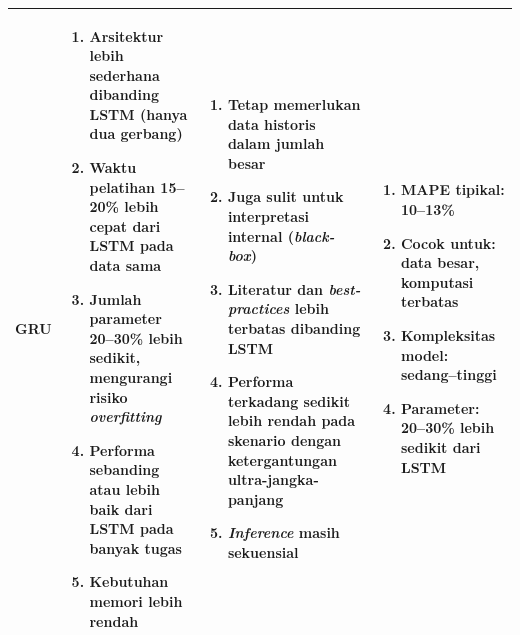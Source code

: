 \begin{longtable}{|p{1.8cm}|p{3.5cm}|p{3.8cm}|p{3cm}|}
\textbf{GRU} &
\begin{enumerate}[leftmargin=*,itemsep=0.5pt,topsep=1pt,partopsep=0pt]
  \item Arsitektur lebih sederhana dibanding LSTM (hanya dua gerbang)
  \item Waktu pelatihan 15--20\% lebih cepat dari LSTM pada data sama
  \item Jumlah parameter 20--30\% lebih sedikit, mengurangi risiko \textit{overfitting}
  \item Performa sebanding atau lebih baik dari LSTM pada banyak tugas
  \item Kebutuhan memori lebih rendah
\end{enumerate}
&
\begin{enumerate}[leftmargin=*,itemsep=0.5pt,topsep=1pt,partopsep=0pt]
  \item Tetap memerlukan data historis dalam jumlah besar
  \item Juga sulit untuk interpretasi internal (\textit{black-box})
  \item Literatur dan \textit{best-practices} lebih terbatas dibanding LSTM
  \item Performa terkadang sedikit lebih rendah pada skenario dengan ketergantungan ultra-jangka-panjang
  \item \textit{Inference} masih sekuensial
\end{enumerate}
&
\begin{enumerate}[leftmargin=*,itemsep=0.5pt,topsep=1pt,partopsep=0pt]
  \item MAPE tipikal: 10--13\%
  \item Cocok untuk: data besar, komputasi terbatas
  \item Kompleksitas model: sedang--tinggi
  \item Parameter: 20--30\% lebih sedikit dari LSTM
\end{enumerate}
\tabularnewline
\hline


\end{longtable}

